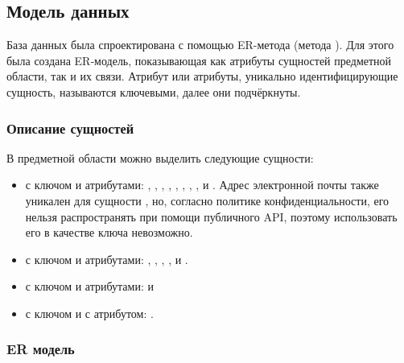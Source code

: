 \subsection{Модель данных}

\tab
База данных была спроектирована с помощью ER-метода (метода ).
Для этого была создана ER‐модель, показывающая как атрибуты сущностей предметной области, так и их связи.
Атрибут или атрибуты, уникально идентифицирующие сущность, называются ключевыми, далее они подчёркнуты.

\subsubsection{Описание сущностей}

\tab
В предметной области можно выделить следующие сущности:
\begin{itemize}
	\item {} с ключом  и атрибутами: , , , , , , , ,  и . Адрес электронной почты также уникален для сущности , но, согласно политике конфиденциальности, его нельзя распространять при помощи публичного API, поэтому использовать его в качестве ключа невозможно.
	\item {} с ключом  и атрибутами: , , , ,  и .
	\item {} с ключом  и атрибутами:  и 
	\item {} с ключом  и с атрибутом: .
\end{itemize}

\subsubsection{ER модель}

